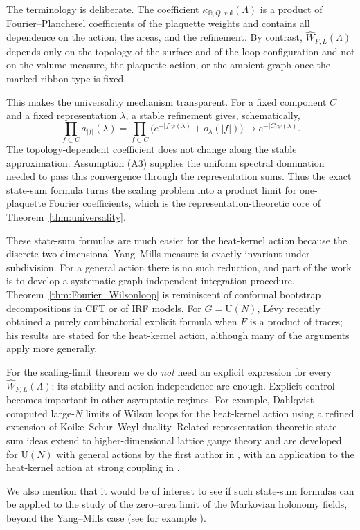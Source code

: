 \documentclass[11pt,a4paper,reqno]{article}
\theoremstyle{definition}
\theoremstyle{remark}
\newcommand\U{{\mathrm U}}
\newcommand\vol{\mathrm{vol}}
\newcommand\Gbb{{\mathbb{G}}}
\begin{document}
The terminology is deliberate. The coefficient $\kappa_{\Gbb,Q,\vol}(\Lambda)$ is a product of Fourier--Plancherel coefficients of the plaquette weights and contains all dependence on the action, the areas, and the refinement. By contrast, $\widehat W_{F,L}(\Lambda)$ depends only on the topology of the surface and of the loop configuration and not on the volume measure, the plaquette action, or the ambient graph once the marked ribbon type is fixed.

This makes the universality mechanism transparent. For a fixed component $C$ and a fixed representation $\lambda$, a stable refinement gives, schematically,
\[
 \prod_{f\subset C}a_{|f|}(\lambda)
 =\prod_{f\subset C}\big(e^{-|f|\psi(\lambda)}+o_\lambda(|f|)\big)
 \longrightarrow e^{-|C|\psi(\lambda)}.
\]
The topology-dependent coefficient does not change along the stable approximation. Assumption (A3) supplies the uniform spectral domination needed to pass this convergence through the representation sums. Thus the exact state-sum formula turns the scaling problem into a product limit for one-plaquette Fourier coefficients, which is the representation-theoretic core of Theorem~\ref{thm:universality}.

These state-sum formulas are much easier for the heat-kernel action because the discrete two-dimensional Yang--Mills measure is exactly invariant under subdivision. For a general action there is no such reduction, and part of the work is to develop a systematic graph-independent integration procedure. Theorem~\ref{thm:Fourier_Wilsonloop} is reminiscent of conformal bootstrap decompositions in CFT or of IRF models. For $G=\U(N)$, L\'evy recently obtained a purely combinatorial explicit formula \cite{Lev26} when $F$ is a product of traces; his results are stated for the heat-kernel action, although many of the arguments apply more generally.

For the scaling-limit theorem we do \emph{not} need an explicit expression for every $\widehat W_{F,L}(\Lambda)$: its stability and action-independence are enough. Explicit control becomes important in other asymptotic regimes. For example, Dahlqvist \cite{Dah26} computed large-$N$ limits of Wilson loops for the heat-kernel action using a refined extension of Koike--Schur--Weyl duality. Related representation-theoretic state-sum ideas extend to higher-dimensional lattice gauge theory and are developed for $\U(N)$ with general actions by the first author in \cite{Lem26b}, with an application to the heat-kernel action at strong coupling in \cite{Lem26c}.
\par We also mention that it would be of interest to see if such state-sum formulas can be applied to the study of the zero--area limit of the Markovian holonomy fields, beyond the Yang--Mills case (see for example \cite{Sen97limit,Liu96,DangNohra26b}).
\end{document}
